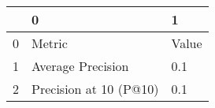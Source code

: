 \begin{tabular}{lll}
\toprule
{} &                       0 &      1 \\
\midrule
0 &                  Metric &  Value \\
1 &       Average Precision &    0.1 \\
2 &  Precision at 10 (P@10) &    0.1 \\
\bottomrule
\end{tabular}
